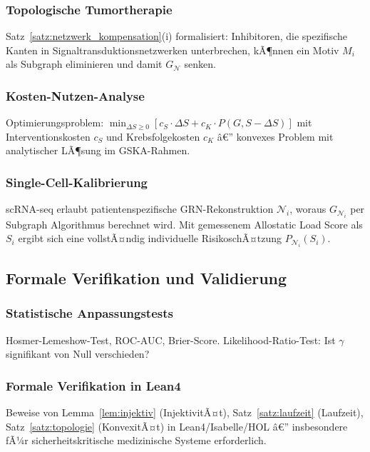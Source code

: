 ﻿\documentclass[12pt, a4paper]{article}
\theoremstyle{definition}
\theoremstyle{remark}
\newcommand{\calN}{\mathcal{N}}
\newcommand{\GN}{G_{\calN}}
\begin{document}
\subsubsection{Topologische Tumortherapie}

Satz~\ref{satz:netzwerk_kompensation}(i) formalisiert: Inhibitoren, die spezifische
Kanten in Signaltransduktionsnetzwerken unterbrechen, kÃ¶nnen ein Motiv $M_i$ als
Subgraph eliminieren und damit $\GN$ senken.

\subsubsection{Kosten-Nutzen-Analyse}

Optimierungsproblem: $\min_{\Delta S \geq 0}[c_S \cdot \Delta S + c_K \cdot P(G, S-\Delta S)]$
mit Interventionskosten $c_S$ und Krebsfolgekosten $c_K$ â€” konvexes Problem mit
analytischer LÃ¶sung im GSKA-Rahmen.

\subsubsection{Single-Cell-Kalibrierung}

scRNA-seq erlaubt patientenspezifische GRN-Rekonstruktion $\calN_i$, woraus
$G_{\calN_i}$ per Subgraph Algorithmus berechnet wird. Mit gemessenem
Allostatic Load Score als $S_i$ ergibt sich eine vollstÃ¤ndig individuelle
RisikoschÃ¤tzung $P_{\calN_i}(S_i)$.

\subsection{Formale Verifikation und Validierung}

\subsubsection{Statistische Anpassungstests}

Hosmer-Lemeshow-Test, ROC-AUC, Brier-Score. Likelihood-Ratio-Test: Ist
$\gamma$ signifikant von Null verschieden?

\subsubsection{Formale Verifikation in Lean4}

Beweise von Lemma~\ref{lem:injektiv} (InjektivitÃ¤t), Satz~\ref{satz:laufzeit}
(Laufzeit), Satz~\ref{satz:topologie} (KonvexitÃ¤t) in Lean4/Isabelle/HOL â€”
insbesondere fÃ¼r sicherheitskritische medizinische Systeme erforderlich.
\end{document}
